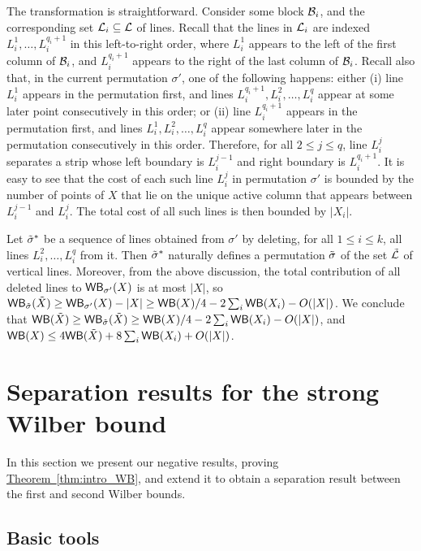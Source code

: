 \documentclass[11pt]{article}
\numberwithin{equation}{section}
\theoremstyle{definition}
\theoremstyle{plain}
\newcommand{\expref}[2]{\hyperref[#2]{#1~\ref{#2}}}
\begin{document}
The transformation is straightforward. Consider some block ${\mathcal{B}}_i$, and the corresponding set ${\mathcal L}_i\subseteq {\mathcal L}$ of lines.
Recall that the lines in ${\mathcal L}_i$ are indexed $L^1_i,\ldots,L^{q_i+1}_i$ in this left-to-right order, where $L^1_i$ appears to the left of the first column of ${\mathcal{B}}_i$, and $L^{q_i+1}_i$ appears to the right of the last column of ${\mathcal{B}}_i$. Recall also that, in the current permutation $\sigma'$, one of the following happens: either (i) line $L^1_i$ appears in the permutation first, and lines $L^{q_i+1}_i,L^2_i,\ldots, L^q_i$ appear at some later point consecutively in this order; or (ii) line $L^{q_i+1}_i$ appears in the permutation first, and lines $L^1_i,L^2_i,\ldots,L^q_i$ appear somewhere later in the permutation consecutively in this order. Therefore, for all $2\leq j\leq q$, line $L_i^j$ separates a strip whose left boundary is $L_i^{j-1}$ and right boundary is $L_i^{q_i+1}$. It is easy to see that the cost of each such line $L_i^j$ in permutation $\sigma'$ is bounded by the number of points of $X$ that lie on the unique active column that appears between $L_i^{j-1}$ and $L_i^j$. The total cost of all such lines is then bounded by $|X_i|$.

Let $\tilde{\sigma}^*$ be a sequence of lines obtained from $\sigma'$ by deleting, for all $1\leq i\leq k$, all lines $L_i^2,\ldots,L_i^q$ from it. Then $\tilde{\sigma}^*$ naturally defines a permutation $\tilde{\sigma}$ of the set $\tilde{\mathcal{L}}$ of vertical lines. Moreover, from the above discussion, the total contribution of all deleted lines to $\mathsf{WB}_{\sigma'}(X)$ is at most $|X|$, so $\mathsf{WB}_{\tilde{\sigma}}(\tilde X)\geq \mathsf{WB}_{\sigma'}(X)-|X|\geq \mathsf{WB}(X)/4-2\sum_i\mathsf{WB}(X_i)-O(|X|)$. We conclude that $\mathsf{WB}(\tilde X)\geq \mathsf{WB}_{\tilde{\sigma}}(\tilde X)\geq \mathsf{WB}(X)/4-2\sum_i\mathsf{WB}(X_i)-O(|X|)$, and $\mathsf{WB}(X)\leq 4\mathsf{WB}(\tilde X)+8\sum_i\mathsf{WB}(X_i)+O(|X|)$.


%

\section{Separation results for the strong Wilber bound}
\label{sec: negative}

In this section we present our negative results,  proving \expref{Theorem}{thm:intro_WB}, and extend it to obtain a separation result between the first and second Wilber bounds. 

%
%
%
%
%
%
%
%
%
%
%
%
%
%
%
%
%




\subsection{Basic tools}
\label{sec: sequences} 
\end{document}
